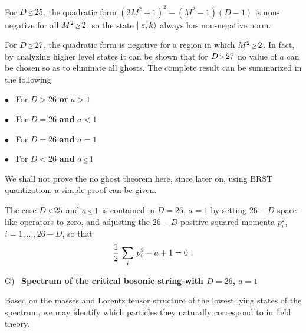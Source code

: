 For $D\Le 25$, the quadratic form
$(2M^2+1)^2-(M^2-1)(D-1)$ is non-negative
for all $M^2\Ge 2$, so 
the state $\vert\left.{\varepsilon},k\right>$ always has
non-negative norm.

For $D\Ge 27$, the quadratic form is negative for a
region in which $M^2\Ge 2$.
In fact, by analyzing higher level states it can be
shown that for $D\Ge 27$ no value of $a$ can be
chosen so as to eliminate all ghosts.
The complete result can be summarized in the
following


\noindent
$\bullet$ \ For $D>26$ {\bf or} $a>1$

{}

\noindent
$\bullet$ \ For $D=26$ {\bf and} $a<1$

{}

\noindent
$\bullet$ \ For $D=26$ {\bf and} $a=1$

{}


\noindent
$\bullet$ \ For $D<26$ {\bf and} $a\Le 1$

{}
\finishproclaim

We shall not prove the no ghost theorem here, since later
on, using BRST quantization, a simple proof can be given.

The case $D\Le 25$ and $a\Le 1$ is contained in $D=26$,
$a=1$ by setting $26-D$ space-like operators to zero, and
adjusting the $26-D$ positive squared momenta
$p_i^2$, $i=1,\ldots,26-D$, so that 
$$
{1\over 2}\,\sum\limits_{i}\,p_i^2-a+1=0\,\,.
$$

\vfill\eject

\noindent
G) \ {\bf Spectrum of the critical bosonic string with
$D=26$, $a=1$}

\smallskip
Based on the masses and Lorentz tensor structure of the
lowest lying states of the spectrum, we may identify which
particles they naturally correspond to in field theory.

